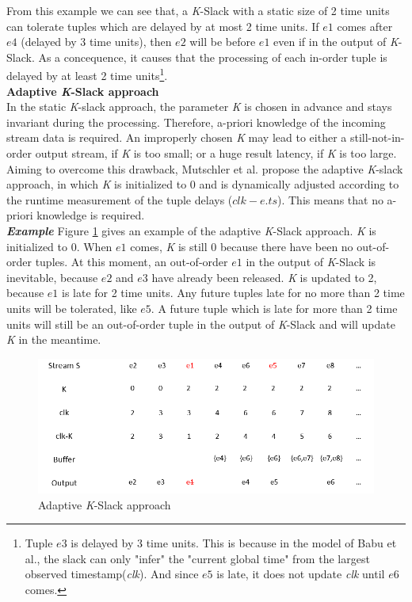 \documentclass[a4paper, 11pt, twoside]{report}
\begin{document}
From this example we can see that, a \textit{K}-Slack with a static size of 2 time units can tolerate tuples which are delayed by at most 2 time units. If $e1$ comes after $e4$ (delayed by 3 time units), then $e2$ will be before $e1$ even if in the output of \textit{K}-Slack. As a concequence, it causes that the processing of each in-order tuple is delayed by at least 2 time units\footnote{Tuple $e3$ is delayed by 3 time units. This is because in the model of Babu et al., the slack can only "infer" the "current global time" from the largest observed timestamp(\textit{clk}). And since $e5$ is late, it does not update \textit{clk} until $e6$ comes.}.\\

\noindent\textbf{Adaptive \textit{K}-Slack approach}\\

In the static \textit{K}-slack approach, the parameter \textit{K} is chosen in advance and stays invariant during the processing. Therefore, a-priori knowledge of the incoming stream data is required. An improperly chosen \textit{K} may lead to either a still-not-in-order output stream, if \textit{K} is too small; or a huge result latency, if \textit{K} is too large.\\

Aiming to overcome this drawback, Mutschler et al. \cite{10.1109/IPDPS.2013.29} propose the adaptive \textit{K}-slack approach, in which \textit{K} is initialized to 0 and is dynamically adjusted according to the runtime measurement of the tuple delays ($clk-e.ts$). This means that no a-priori knowledge is required. \\

\noindent\textbf{\textit{Example}} Figure \ref{fig:adaptive-k-slack-example} gives an example of the adaptive \textit{K}-Slack approach. \textit{K} is initialized to 0. When $e1$ comes, \textit{K} is still 0 because there have been no out-of-order tuples. At this moment, an out-of-order $e1$ in the output of \textit{K}-Slack is inevitable, because $e2$ and $e3$ have already been released. \textit{K} is updated to 2, because $e1$ is late for 2 time units. Any future tuples late for no more than 2 time units will be tolerated, like $e5$. A future tuple which is late for more than 2 time units will still be an out-of-order tuple in the output of \textit{K}-Slack and will update \textit{K} in the meantime.\\

\begin{figure}[h]
\centering
\includegraphics[width=5in]{adaptive-k-slack-example}
\caption{Adaptive \textit{K}-Slack approach \label{fig:adaptive-k-slack-example}}
\end{figure}
\end{document}
